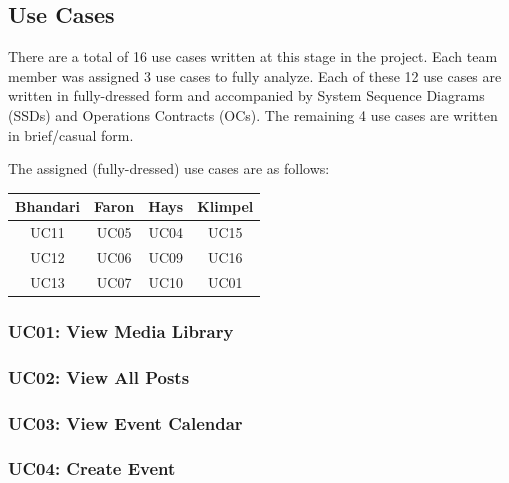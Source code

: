 \documentclass{article}
\begin{document}
\subsection{Use Cases}
There are a total of 16 use cases written at this stage in the project. Each team member was assigned 3 use cases to fully analyze. Each of these 12 use cases are written in fully-dressed form and accompanied by System Sequence Diagrams (SSDs) and Operations Contracts (OCs). The remaining 4 use cases are written in brief/casual form.

The assigned (fully-dressed) use cases are as follows:

\begin{center}
    \begin{tabular}{ | c | c | c | c | }
        \hline
        Bhandari & Faron & Hays & Klimpel \\
        \hline
        UC11     & UC05  & UC04 & UC15    \\
        \hline
        UC12     & UC06  & UC09 & UC16    \\
        \hline
        UC13     & UC07  & UC10 & UC01    \\
        \hline
    \end{tabular}
\end{center}
\subsubsection{UC01: View Media Library}

\subsubsection{UC02: View All Posts}

\subsubsection{UC03: View Event Calendar}

\subsubsection{UC04: Create Event}

\end{document}
